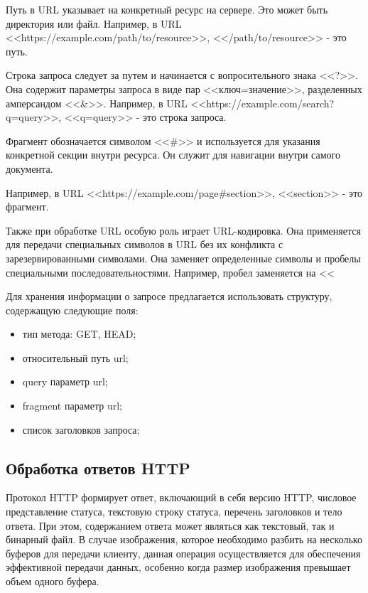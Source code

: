 Путь в URL указывает на конкретный ресурс на сервере. Это может быть директория или файл. Например, в URL <<https://example.com/path/to/resource>>, <</path/to/resource>> - это путь.

Строка запроса следует за путем и начинается с вопросительного знака <<?>>. Она содержит параметры запроса в виде пар <<ключ=значение>>, разделенных амперсандом <<\&>>. Например, в URL <<https://example.com/search?q=query>>, <<q=query>> - это строка запроса.

Фрагмент обозначается символом <<\#>> и используется для указания конкретной секции внутри ресурса. 
Он служит для навигации внутри самого документа. 

Например, в URL <<https://example.com/page\#section>>, <<section>> - это фрагмент.


Также при обработке URL особую роль играет URL-кодировка. Она применяется для передачи специальных символов в URL без их конфликта с зарезервированными символами. Она заменяет определенные символы и пробелы специальными последовательностями. Например, пробел заменяется на <<%


Для хранения информации о запросе предлагается использовать структуру, содержащую следующие поля:

\begin{itemize}
    \item тип метода: GET, HEAD;
    \item относительный путь url;
    \item query параметр url;
    \item fragment параметр url;
    \item список заголовков запроса;
\end{itemize}

\subsection{Обработка ответов HTTP}

Протокол HTTP формирует ответ, включающий в себя версию HTTP, числовое представление статуса, текстовую строку статуса, перечень заголовков и тело ответа. При этом, содержанием ответа может являться как текстовый, так и бинарный файл. В случае изображения, которое необходимо разбить на несколько буферов для передачи клиенту, данная операция осуществляется для обеспечения эффективной передачи данных, особенно когда размер изображения превышает объем одного буфера.

